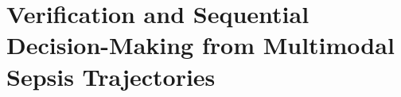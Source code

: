 \chapter{Verification and Sequential Decision-Making from Multimodal Sepsis Trajectories}\label{chap:ch09}

